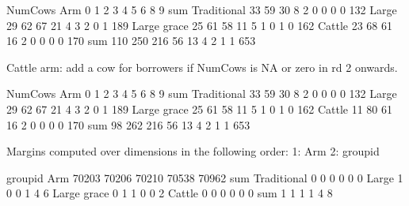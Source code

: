 \begin{Schunk}
\begin{Soutput}
             NumCows
Arm             0   1   2   3   4   5   6   8   9 sum
  Traditional  33  59  30   8   2   0   0   0   0 132
  Large        29  62  67  21   4   3   2   0   1 189
  Large grace  25  61  58  11   5   1   0   1   0 162
  Cattle       23  68  61  16   2   0   0   0   0 170
  sum         110 250 216  56  13   4   2   1   1 653
\end{Soutput}
\end{Schunk}
Cattle arm: add a cow for borrowers if NumCows is NA or zero in rd 2 onwards.
\begin{Schunk}
\begin{Soutput}
             NumCows
Arm             0   1   2   3   4   5   6   8   9 sum
  Traditional  33  59  30   8   2   0   0   0   0 132
  Large        29  62  67  21   4   3   2   0   1 189
  Large grace  25  61  58  11   5   1   0   1   0 162
  Cattle       11  80  61  16   2   0   0   0   0 170
  sum          98 262 216  56  13   4   2   1   1 653
\end{Soutput}
\begin{Soutput}
Margins computed over dimensions
in the following order:
1: Arm
2: groupid
\end{Soutput}
\begin{Soutput}
             groupid
Arm           70203 70206 70210 70538 70962 sum
  Traditional     0     0     0     0     0   0
  Large           1     0     0     1     4   6
  Large grace     0     1     1     0     0   2
  Cattle          0     0     0     0     0   0
  sum             1     1     1     1     4   8
\end{Soutput}
\end{Schunk}



